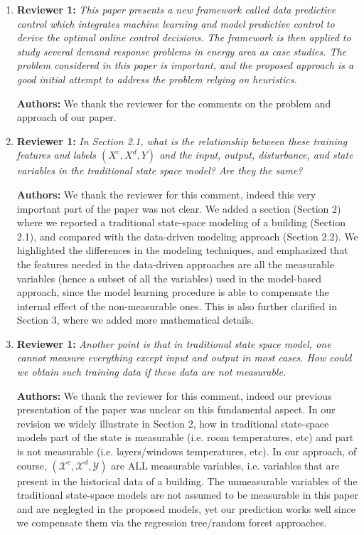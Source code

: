 \documentclass{article}
\begin{document}
\begin{enumerate}

\item \textbf{Reviewer 1:} \textit{This paper presents a new framework called data predictive control which integrates machine learning and model predictive control to derive the optimal online control decisions. The framework is then applied to study several demand response problems in energy area as case studies. The problem considered in this paper is important, and the proposed approach is a good initial attempt to address the problem relying on heuristics.}

\textbf{Authors:} We thank the reviewer for the comments on the problem and approach of our paper.

\item \textbf{Reviewer 1:} \textit{In Section 2.1, what is the relationship between these training features and labels $(X^c, X^d, Y)$ and the input, output, disturbance, and state variables in the traditional state space model? Are they the same?}

\textbf{Authors:} We thank the reviewer for this comment, indeed this very important part of the paper was not clear.
We added a section (Section 2) where we reported a traditional state-space modeling of a building (Section 2.1), and compared with the data-driven modeling approach (Section 2.2). We highlighted the differences in the modeling techniques, and emphasized that the features needed in the data-driven approaches are all the measurable variables (hence a subset of all the variables) used in the model-based approach, since the model learning procedure is able to compensate the internal effect of the non-measurable ones. This is also further clarified in Section 3, where we added more mathematical details.

\item \textbf{Reviewer 1:} \textit{Another point is that in traditional state space model, one cannot measure everything except input and output in most cases. How could we obtain such training data if these data are not measurable.}

\textbf{Authors:} We thank the reviewer for this comment, indeed our previous presentation of the paper was unclear on this fundamental aspect. In our revision we widely illustrate in Section 2, how in traditional state-space models part of the state is measurable (i.e. room temperatures, etc) and part is not measurable (i.e. layers/windows temperatures, etc). In our approach, of course, $(\mathcal{X}^c, \mathcal{X}^d, \mathcal{Y})$ are ALL measurable variables, i.e. variables that are present in the historical data of a building. The unmeasurable variables of the traditional state-space models are not assumed to be measurable in this paper and are neglegted in the proposed models, yet our prediction works well since we compensate them via the regression tree/random forest approaches.


\end{enumerate}
\end{document}
